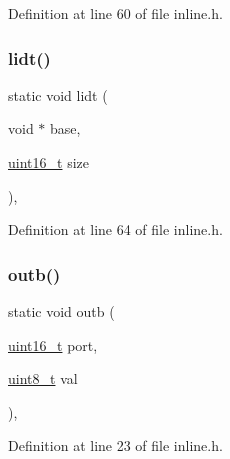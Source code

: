 Definition at line 60 of file inline.\+h.

\mbox{\label{a00026_a31967dec32575d3d398e6d289e888d1f_a31967dec32575d3d398e6d289e888d1f}} 
\subsubsection{\texorpdfstring{lidt()}{lidt()}}
{\footnotesize\ttfamily static void lidt (\begin{DoxyParamCaption}\item[{void $\ast$}]{base,  }\item[{\hyperlink{a00023_a273cf69d639a59973b6019625df33e30_a273cf69d639a59973b6019625df33e30}{uint16\+\_\+t}}]{size }\end{DoxyParamCaption})\hspace{0.3cm}{\ttfamily [inline]}, {\ttfamily [static]}}



Definition at line 64 of file inline.\+h.

\mbox{\label{a00026_aa37f5841c54156a4b14fc0d6f626b44f_aa37f5841c54156a4b14fc0d6f626b44f}} 
\subsubsection{\texorpdfstring{outb()}{outb()}}
{\footnotesize\ttfamily static void outb (\begin{DoxyParamCaption}\item[{\hyperlink{a00023_a273cf69d639a59973b6019625df33e30_a273cf69d639a59973b6019625df33e30}{uint16\+\_\+t}}]{port,  }\item[{\hyperlink{a00023_aba7bc1797add20fe3efdf37ced1182c5_aba7bc1797add20fe3efdf37ced1182c5}{uint8\+\_\+t}}]{val }\end{DoxyParamCaption})\hspace{0.3cm}{\ttfamily [inline]}, {\ttfamily [static]}}



Definition at line 23 of file inline.\+h.

\mbox{\label{a00026_a6fa28502e33e305c4335fe3032dc7799_a6fa28502e33e305c4335fe3032dc7799}} 
